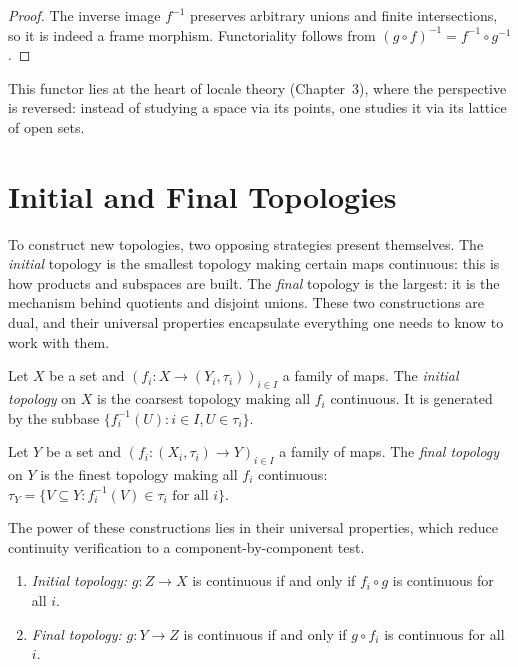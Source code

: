 \begin{proof}
The inverse image $f^{-1}$ preserves arbitrary unions and finite intersections, so it is
indeed a frame morphism. Functoriality follows from
$(g \circ f)^{-1} = f^{-1} \circ g^{-1}$.
\end{proof}

\begin{remark}
This functor lies at the heart of locale theory (Chapter~3), where the perspective is
reversed: instead of studying a space via its points, one studies it via its lattice of
open sets.
\end{remark}

\section{Initial and Final Topologies}

To construct new topologies, two opposing strategies present themselves. The
\emph{initial} topology is the smallest topology making certain maps
continuous: this is how products and subspaces are built. The \emph{final}
topology is the largest: it is the mechanism behind quotients and disjoint
unions. These two constructions are dual, and their universal properties
encapsulate everything one needs to know to work with them.

\begin{definition}
Let $X$ be a set and $(f_i\colon X \to (Y_i,\tau_i))_{i\in I}$ a family of maps. The
\emph{initial topology} on $X$ is the coarsest topology making all $f_i$ continuous. It is
generated by the subbase $\{f_i^{-1}(U) : i \in I, U \in \tau_i\}$.
\end{definition}

\begin{definition}
Let $Y$ be a set and $(f_i\colon (X_i,\tau_i) \to Y)_{i\in I}$ a family of maps. The
\emph{final topology} on $Y$ is the finest topology making all $f_i$ continuous:
$\tau_Y = \{V \subseteq Y : f_i^{-1}(V) \in \tau_i \text{ for all } i\}$.
\end{definition}

The power of these constructions lies in their universal properties, which
reduce continuity verification to a component-by-component test.

\begin{theorem}
\begin{enumerate}
  \item \emph{Initial topology:} $g\colon Z \to X$ is continuous if and only if
    $f_i \circ g$ is continuous for all $i$.
  \item \emph{Final topology:} $g\colon Y \to Z$ is continuous if and only if
    $g \circ f_i$ is continuous for all $i$.
\end{enumerate}
\end{theorem}

